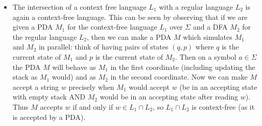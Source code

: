 \begin{itemize}
	\item The intersection of a context free language $L_{1}$ with a regular language $L_{2}$ is again a context-free language. This can be seen by observing that if we are given a PDA $M_{1}$ for the context-free language $L_{1}$ over $\Sigma$ and a DFA $M_{2}$ for the regular language $L_{2}$, then we can make a PDA $M$ which simulates $M_{1}$ and $M_{2}$ in parallel: think of having pairs of states $(q,p)$ where $q$ is the current state of $M_{1}$ and $p$ is the current state of $M_{2}$. Then on a symbol $a \in \Sigma$ the PDA $M$ will behave as $M_{1}$ in the first coordinate (including updating the stack as $M_{1}$ would) and as $M_2$ in the second coordinate. Now we can make $M$ accept a string $w$ precisely when $M_{1}$ would accept $w$ (be in an accepting state with empty stack AND $M_{2}$ would be in an accepting state after reading $w$). Thus $M$ accepts $w$ if and only if $w \in L_{1} \cap L_{2}$, so $L_{1} \cap L_{2}$ is context-free (as it is accepted by a PDA).

\end{itemize}

